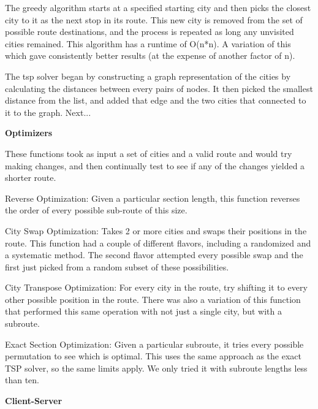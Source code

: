 \documentclass[letterpaper,10pt,titlepage,fleqn]{article}
\begin{document}
The greedy algorithm starts at a specified starting city and then picks the closest city to it as the next stop in its route. This new city is removed from the set of possible route destinations, and the process is repeated as long any unvisited cities remained. This algorithm has a runtime of O(n*n). A variation of this which gave consistently better results (at the expense of another factor of n).

The tsp solver began by constructing a graph representation of the cities by calculating the distances between every pairs of nodes. It then picked the smallest distance from the list, and added that edge and the two cities that connected to it to the graph. Next... \\

\begin{Large}
\textbf{Optimizers} \\
\end{Large}
These functions took as input a set of cities and a valid route and would try making changes, and then continually test to see if any of the changes yielded a shorter route.

Reverse Optimization: Given a particular section length, this function reverses the order of every possible sub-route of this size.

City Swap Optimization: Takes 2 or more cities and swaps their positions in the route. This function had a couple of different flavors, including a randomized and a systematic method. The second flavor attempted every possible swap and the first just picked from a random subset of these possibilities.

City Transpose Optimization: For every city in the route, try shifting it to every other possible position in the route. There was also a variation of this function that performed this same operation with not just a single city, but with a subroute.

Exact Section Optimization: Given a particular subroute, it tries every possible permutation to see which is optimal. This uses the same approach as the exact TSP solver, so the same limits apply. We only tried it with subroute lengths less than ten. \\

\begin{Large}
\textbf{Client-Server}\\
\end{Large}

\end{document}
